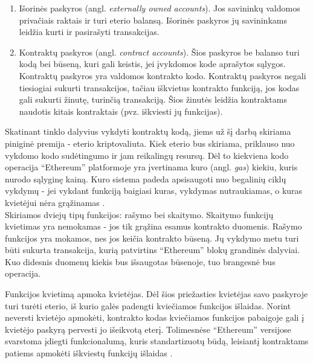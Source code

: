 \begin{enumerate}
    \item Išorinės paskyros (angl. \textit{externally owned accounts}). Jos savininkų valdomos privačiais raktais ir turi eterio
    balansą. Išorinės paskyros jų savininkams leidžia kurti ir pasirašyti transakcijas.
    \item Kontraktų paskyros (angl. \textit{contract accounts}). Šios paskyros be balanso turi kodą bei būseną, kuri gali keistis,
    jei įvykdomos kode aprašytos sąlygos. Kontraktų paskyros yra valdomos kontrakto kodo. Kontraktų paskyros negali
    tiesiogiai sukurti transakcijos, tačiau iškvietus kontrakto funkciją, jos kodas gali sukurti žinutę, turinčią transakciją. Šios
    žinutės leidžia kontraktams naudotis kitais kontraktais (pvz. iškviesti jų funkcijas).
\end{enumerate}

Skatinant tinklo dalyvius vykdyti kontraktų kodą, jiems už šį darbą skiriama piniginė premija - eterio kriptovaliuta. Kiek eterio
bus skiriama, priklauso nuo vykdomo kodo sudėtingumo ir jam reikalingų resursų. Dėl to kiekviena kodo operacija \enquote{Ethereum} platformoje
yra įvertinama kuro (angl. \textit{gas}) kiekiu, kuris nurodo sąlyginę kainą. Kuro sistema padeda apsisaugoti nuo begalinių ciklų vykdymų - jei vykdant
funkciją baigiasi kuras, vykdymas nutraukiamas, o kuras kvietėjui nėra grąžinamas \cite{EthereumWhitePaper}.\\
Skiriamos dviejų tipų funkcijos: rašymo bei skaitymo. Skaitymo funkcijų kvietimas yra nemokamas - jos tik grąžina
esamus kontrakto duomenis. Rašymo funkcijos yra mokamos, nes jos keičia kontrakto būseną. Jų vykdymo metu turi būti sukurta transakcija,
kurią patvirtins \enquote{Ethereum} blokų grandinės dalyviai. Kuo didesnis duomenų kiekis bus išsaugotas būsenoje, tuo brangesnė bus operacija.

Funkcijos kvietimą apmoka kvietėjas. Dėl šios priežasties kvietėjas savo paskyroje turi turėti eterio, iš kurio galės padengti
kviečiamos funkcijos išlaidas. Norint neversti kvietėjo apmokėti, kontrakto kodas kviečiamos funkcijos pabaigoje gali į kvietėjo paskyrą
pervesti jo išeikvotą eterį. Tolimesnėse \enquote{Ethereum} versijose svarstoma įdiegti funkcionalumą,
kuris standartizuotų būdą, leisiantį kontraktams patiems apmokėti iškviestų funkcijų išlaidas \cite{ContractPays}.

